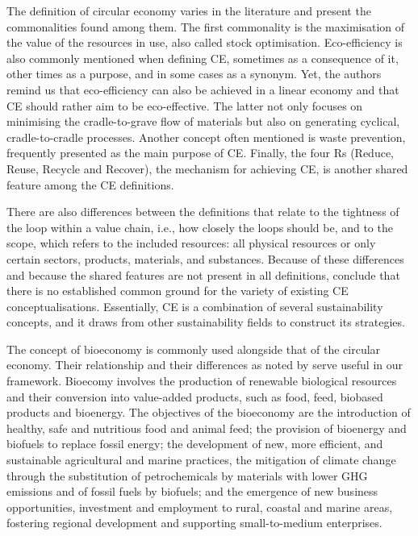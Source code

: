  The definition of circular economy varies in the literature and \cite{kalmykova2018circular} present the commonalities found among them. The first commonality is the maximisation of the value of the resources in use, also called stock optimisation. Eco-efficiency is also commonly mentioned when defining CE, sometimes as a consequence of it, other times as a purpose, and in some cases as a synonym. Yet, the authors remind us that eco-efficiency can also be achieved in a linear economy and that CE should rather aim to be eco-effective. The latter not only focuses on minimising the cradle-to-grave flow of materials but also on generating cyclical, cradle-to-cradle processes. Another concept often mentioned is waste prevention, frequently presented as the main purpose of CE. Finally, the four Rs (Reduce, Reuse, Recycle and Recover), the mechanism for achieving CE, is another shared feature among the CE definitions. 

There are also differences between the definitions that relate to the tightness of the loop within a value chain, i.e., how closely the loops should be, and to the scope, which refers to the included resources: all physical resources or only certain sectors, products, materials, and substances. Because of these differences and because the shared features are not present in all definitions, \citeauthor{kalmykova2018circular} conclude that there is no established common ground for the variety of existing CE conceptualisations. Essentially, CE is a combination of several sustainability concepts, and it draws from other sustainability fields to construct its strategies. 

The concept of bioeconomy is commonly used alongside that of the circular economy. Their relationship and their differences as noted by \cite{carus2018circular} serve useful in our framework. Bioecomy involves the production of renewable biological resources and their conversion into value-added products, such as food, feed, biobased products and bioenergy. The objectives of the bioeconomy are the introduction of healthy, safe and nutritious food and animal feed; the provision of bioenergy and biofuels to replace fossil energy; the development of new, more efficient, and sustainable agricultural and marine practices, the mitigation of climate change through the substitution of petrochemicals by materials with lower GHG emissions and of fossil fuels by biofuels; and the emergence of new business opportunities, investment and employment to rural, coastal and marine areas, fostering regional development and supporting small-to-medium enterprises.

